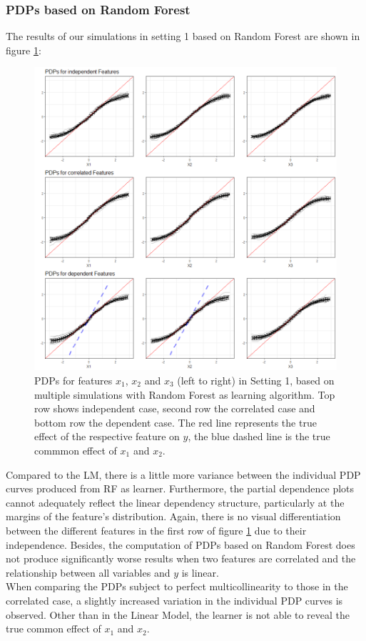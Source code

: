 \documentclass[
]{krantz}
\begin{document}
\hypertarget{pdps-based-on-random-forest}{%
\subsubsection{PDPs based on Random Forest}\label{pdps-based-on-random-forest}}

The results of our simulations in setting 1 based on Random Forest are shown in figure \ref{fig:Figure15}:

\begin{figure}

\includegraphics[width=1\linewidth]{images/VK_PDP_15_Set1_RF} \hfill{}

\caption{PDPs for features $x_1$, $x_2$ and $x_3$ (left to right) in Setting 1, based on multiple simulations with Random Forest as learning algorithm. Top row shows independent case, second row the correlated case and bottom row the dependent case. The red line represents the true effect of the respective feature on $y$, the blue dashed line is the true commmon effect of $x_1$ and $x_2$.}\label{fig:Figure15}
\end{figure}

Compared to the LM, there is a little more variance between the individual PDP curves produced from RF as learner. Furthermore, the partial dependence plots cannot adequately reflect the linear dependency structure, particularly at the margins of the feature's distribution. Again, there is no visual differentiation between the different features in the first row of figure \ref{fig:Figure15} due to their independence. Besides, the computation of PDPs based on Random Forest does not produce significantly worse results when two features are correlated and the relationship between all variables and \(y\) is linear.\\
When comparing the PDPs subject to perfect multicollinearity to those in the correlated case, a slightly increased variation in the individual PDP curves is observed. Other than in the Linear Model, the learner is not able to reveal the true common effect of \(x_1\) and \(x_2\).
\end{document}
